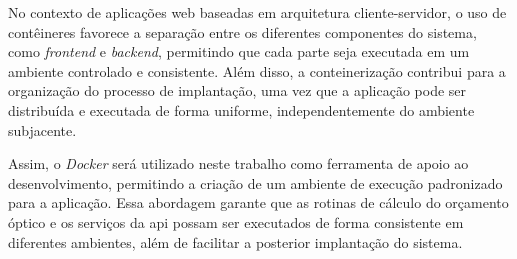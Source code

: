No contexto de aplicações web baseadas em arquitetura cliente-servidor, o uso de contêineres favorece a separação entre os diferentes componentes do sistema, como \textit{frontend} e \textit{backend}, permitindo que cada parte seja executada em um ambiente controlado e consistente. Além disso, a conteinerização contribui para a organização do processo de implantação, uma vez que a aplicação pode ser distribuída e executada de forma uniforme, independentemente do ambiente subjacente.
 
Assim, o \textit{Docker} será utilizado neste trabalho como ferramenta de apoio ao desenvolvimento, permitindo a criação de um ambiente de execução padronizado para a aplicação. Essa abordagem garante que as rotinas de cálculo do orçamento óptico e os serviços da \gls{api} possam ser executados de forma consistente em diferentes ambientes, além de facilitar a posterior implantação do sistema.
